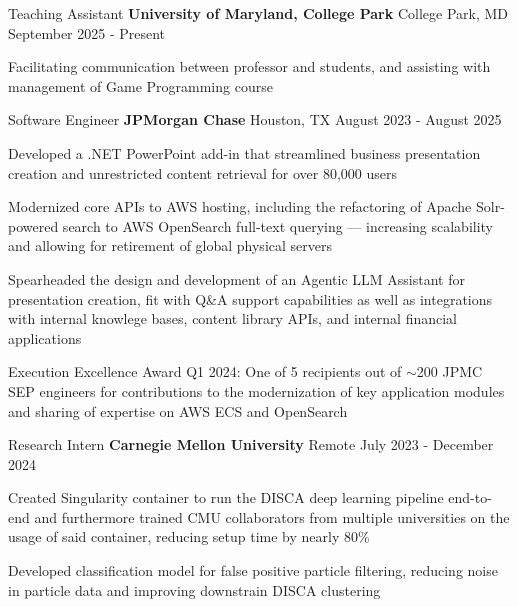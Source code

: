 
\begin{cventries}


  \cventry
    {Teaching Assistant}
    {\textbf{University of Maryland, College Park}}
    {College Park, MD}
    {September 2025 - Present}
    {
      \begin{cvitems}
        \item{Facilitating communication between professor and students, and assisting with management of Game Programming course}
      \end{cvitems}
    }

  \cventry
    {Software Engineer}
    {\textbf{JPMorgan Chase}}
    {Houston, TX}
    {August 2023 - August 2025}
    {
      \begin{cvitems}
        \item{Developed a .NET PowerPoint add-in that streamlined business presentation creation and unrestricted content retrieval for over 80,000 users}
        \item{Modernized core APIs to AWS hosting, including the refactoring of Apache Solr-powered search to AWS OpenSearch full-text querying --- increasing scalability and allowing for retirement of global physical servers}
        \item{Spearheaded the design and development of an Agentic LLM Assistant for presentation creation, fit with Q\&A support capabilities as well as integrations with internal knowlege bases, content library APIs, and internal financial applications}
        \item{Execution Excellence Award Q1 2024: One of 5 recipients out of $\sim$200 JPMC SEP engineers for contributions to the modernization of key application modules and sharing of expertise on AWS ECS and OpenSearch}
      \end{cvitems}
    }

  \cventry
    {Research Intern}
    {\textbf{Carnegie Mellon University}}
    {Remote}
    {July 2023 - December 2024}
    {
      \begin{cvitems}
        \item{Created Singularity container to run the DISCA deep learning pipeline end-to-end and furthermore trained CMU collaborators from multiple universities on the usage of said container, reducing setup time by nearly 80\%}
        \item{Developed classification model for false positive particle filtering, reducing noise in particle data and improving downstrain DISCA clustering}
      \end{cvitems}
    }


\end{cventries}
